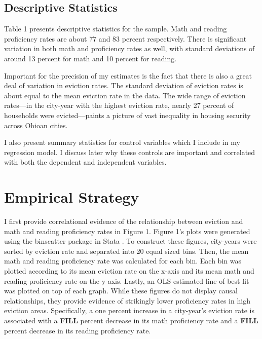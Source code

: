 \documentclass[12pt]{article}
\begin{document}
\subsection{Descriptive Statistics}
Table 1 presents descriptive statistics for the sample. Math and reading proficiency rates are about 77 and 83 percent respectively. There is significant variation in both math and proficiency rates as well, with standard deviations of around 13 percent for math and 10 percent for reading.

Important for the precision of my estimates is the fact that there is also a great deal of variation in eviction rates. The standard deviation of eviction rates is about equal to the mean eviction rate in the data. The wide range of  eviction rates—in the city-year with the highest eviction rate, nearly 27 percent of households were evicted—paints a picture of vast inequality in housing security across Ohioan cities.

I also present summary statistics for control variables which I include in my regression model. I discuss later why these controls are important and correlated with both the dependent and independent variables.



\section{Empirical Strategy} \label{sec:empirical_strategy}
I first provide correlational evidence of the relationship between eviction and math and reading proficiency rates in Figure 1. Figure 1's plots were generated using the binscatter package in Stata \citep{stepner_binscatter:_2013}. To construct these figures, city-years were sorted by eviction rate and separated into 20 equal sized bins. Then, the mean math and reading proficiency rate was calculated for each bin. Each bin was plotted according to its mean eviction rate on the x-axis and its mean math and reading proficiency rate on the y-axis. Lastly, an OLS-estimated line of best fit was plotted on top of each graph. While these figures do not display causal relationships, they provide evidence of strikingly lower proficiency rates in high eviction areas.  Specifically, a one percent increase in a city-year's eviction rate is associated with a \textbf{FILL} percent decrease in its math proficiency rate and a \textbf{FILL} percent decrease in its reading proficiency rate.
\end{document}
